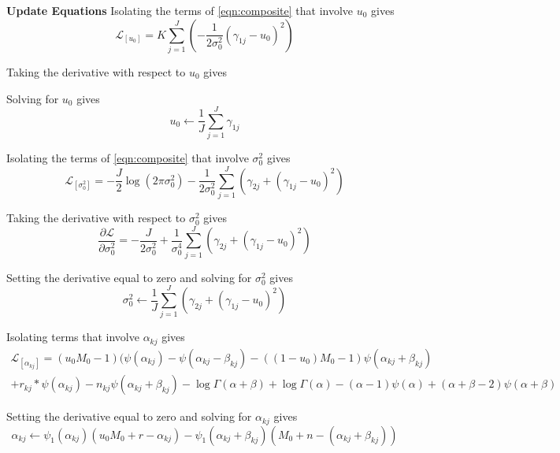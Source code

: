 \documentclass[10pt, letterpaper]{article}
\begin{document}
{\bf Update Equations}
Isolating the terms of \eqref{eqn:composite} that involve $u_0$ gives
\begin{equation}
\mathcal{L}_{[u_0]} = K\sum_{j=1}^J\left(-\frac{1}{2\sigma_0^2}(\gamma_{1j}-u_0)^2\right)
\end{equation}

Taking the derivative with respect to $u_0$ gives


Solving for $u_0$ gives
\begin{equation}
u_0 \leftarrow \frac{1}{J}\sum_{j=1}^J \gamma_{1j} 
\end{equation}

Isolating the terms of \eqref{eqn:composite} that involve $\sigma^2_0$ gives
\begin{equation}
\mathcal{L}_{[\sigma^2_0]} = -\frac{J}{2}\log(2\pi\sigma^2_0) -\frac{1}{2\sigma_0^2}\sum_{j=1}^J\left(\gamma_{2j} + (\gamma_{1j}-u_0)^2 \right)
\end{equation}

Taking the derivative with respect to $\sigma^2_0$ gives
\begin{equation}
\frac{\partial \mathcal{L}}{\partial \sigma^2_0} = -\frac{J}{2\sigma^2_0} +\frac{1}{\sigma^4_0}\sum_{j=1}^J\left(\gamma_{2j} + (\gamma_{1j}-u_0)^2\right)
\end{equation}

Setting the derivative equal to zero and solving for $\sigma^2_0$ gives
\begin{equation}
\sigma^2_0 \leftarrow \frac{1}{J}\sum_{j=1}^J\left(\gamma_{2j} + (\gamma_{1j}-u_0)^2\right)
\end{equation}

Isolating terms that involve $\alpha_{kj}$ gives
\begin{multline}
\mathcal{L}_{[\alpha_{kj}]} = (u_0M_0 -1)(\psi(\alpha_{kj}) - \psi(\alpha_{kj}-\beta_{kj}) -((1-u_0)M_0-1)\psi(\alpha_{kj}+\beta_{kj})\\
 +r_{kj}*\psi(\alpha_{kj})-n_{kj}\psi(\alpha_{kj}+\beta_{kj}) -\log \Gamma (\alpha+\beta) + \log \Gamma(\alpha) -(\alpha-1)\psi(\alpha)+(\alpha+\beta-2)\psi(\alpha+\beta)
\end{multline}

Setting the derivative equal to zero and solving for $\alpha_{kj}$ gives
\begin{equation}
\alpha_{kj} \leftarrow \psi_1(\alpha_{kj})(u_0M_0+r-\alpha_{kj}) - \psi_1(\alpha_{kj}+\beta_{kj})(M_0+n-(\alpha_{kj}+\beta_{kj}))
\end{equation}
\end{document}
